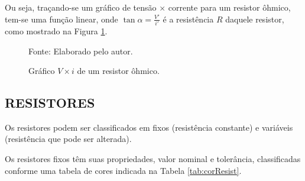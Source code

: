 \documentclass[12pt]{article}
\begin{document}
    Ou seja, traçando-se um gráfico de tensão $\times$ corrente para um resistor ôhmico, tem-se uma função linear, onde $\tan{\alpha}=\frac{V'}{i'}$ é a resistência $R$ daquele resistor, como mostrado na Figura \ref{fig:resistorohmico}.
        \begin{figure}[h!]
            \centering
            \begin{minipage}{0.5\textwidth}
                \centering
                \caption{Gráfico $V\times i$ de um resistor ôhmico.}

                \raggedright \footnotesize Fonte: Elaborado pelo autor.
                \label{fig:resistorohmico}
            \end{minipage}
        \end{figure}
    
    \subsection{RESISTORES}\indent

    Os resistores podem ser classificados em fixos (resistência constante) e variáveis (resistência que pode ser alterada).

    Os resistores fixos têm suas propriedades, valor nominal e tolerância, classificadas conforme uma tabela de cores indicada na Tabela \ref{tab:corResist}.
\end{document}
